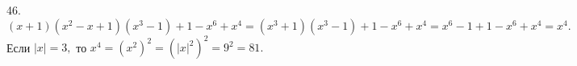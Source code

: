 46. $(x+1)(x^2-x+1)(x^3-1)+1-x^6+x^4=(x^3+1)(x^3-1)+1-x^6+x^4=x^6-1+1-x^6+x^4=x^4.$ Если $|x|=3,$ то $x^4=(x^2)^2=(|x|^2)^2=9^2=81.$\\
